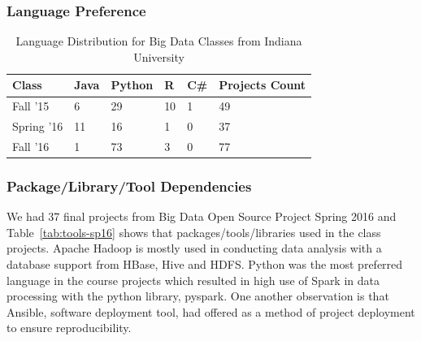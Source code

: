 \documentclass[9pt,twocolumn,twoside]{styles/osajnl}
\begin{document}
\subsubsection{Language Preference}

\begin{table}[htb]
  \begin{center}
    \begin{small}
      \begin{threeparttable}
        \begin{tabular}{l|l|l|l|l|l}

    Class      & Java & Python & R  & C\# & Projects Count \\ \hline \hline
    Fall '15   & 6    & 29     & 10 & 1   & 49             \\ \hline
    Spring '16 & 11   & 16     & 1  & 0   & 37             \\ \hline
    Fall '16   & 1    & 73     & 3  & 0   & 77             \\ 

        \end{tabular}
        \caption{Language Distribution for Big Data Classes from Indiana University}
        \label{tab:lang-dist-iu}
      \end{threeparttable}
    \end{small}
  \end{center}
\end{table}



\subsubsection{Package/Library/Tool Dependencies}

We had 37 final projects from Big Data Open Source Project Spring 2016
and Table~\ref{tab:tools-sp16} shows that packages/tools/libraries used in the
class projects. Apache Hadoop is mostly used in conducting data analysis with a
database support from HBase, Hive and HDFS. Python was the most preferred
language in the course projects which resulted in high use of Spark in data
processing with the python library, pyspark. One another observation is that
Ansible, software deployment tool, had offered as a method of project
deployment to ensure reproducibility.
\end{document}

